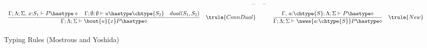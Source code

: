 \begin{figure}[!t]
\[\begin{array}{crccr}
	\quad & 
	-  & - 
	\vspace{2mm}
	\\
	\displaystyle \frac{\Gamma ; \Lambda; \Sigma, \, x{:}S_1 \vdash P \hastype \Proc  \quad \Gamma ; \emptyset; \emptyset \vdash u \hastype \chtype{S_2} \quad dual(S_1, S_2)}{\Gamma ; \Lambda; \Sigma \vdash \bout{u}{x} P \hastype \Proc} & \trule{ConnDual}& \quad &
	\displaystyle \frac{\Gamma, \, a{:}\chtype{S} ; \Lambda; \Sigma \vdash P \hastype \Proc  }{\Gamma ; \Lambda; \Sigma \vdash \news{a{:}\chtype{S}} P \hastype \Proc}  & \trule{New} 
	\vspace{2mm}
	\\
	\end{array}
\]
\caption{Typing Rules (Mostrous and Yoshida)}
\end{figure}
	